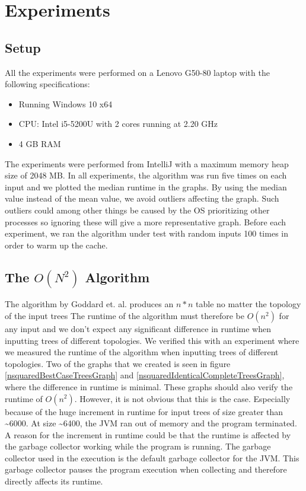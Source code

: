\chapter{Experiments}
\section{Setup}
All the experiments were performed on a Lenovo G50-80 laptop with the following specifications:

\begin{itemize}
	\item Running Windows 10 x64
	\item CPU: Intel i5-5200U with 2 cores running at 2.20 GHz
	\item 4 GB RAM
\end{itemize}

The experiments were performed from IntelliJ with a maximum memory heap size of 2048 MB.
In all experiments, the algorithm was run five times on each input and we plotted the median runtime in the graphs. By using the median value instead of the mean value, we avoid outliers affecting the graph. Such outliers could among other things be caused by the OS prioritizing other processes so ignoring these will give a more representative graph. Before each experiment, we ran the algorithm under test with random inputs 100 times in order to warm up the cache.

\section{The $O(N^2)$ Algorithm}
The algorithm by Goddard et. al. \cite{nsquared} produces an $n*n$ table no matter the topology of the input trees The runtime of the algorithm must therefore be $O(n^2)$ for any input and we don't expect any significant difference in runtime when inputting trees of different topologies. We verified this with an experiment where we measured the runtime of the algorithm when inputting trees of different topologies. Two of the graphs that we created is seen in figure \ref{nsquaredBestCaseTreesGraph} and \ref{nsquaredIdenticalCompleteTreesGraph}, where the difference in runtime is minimal. These graphs should also verify the runtime of $O(n^2)$. However, it is not obvious that this is the case. Especially because of the huge increment in runtime for input trees of size greater than \textasciitilde 6000. At size \textasciitilde 6400, the JVM ran out of memory and the program terminated. A reason for the increment in runtime could be that the runtime is affected by the garbage collector working while the program is running. The garbage collector used in the execution is the default garbage collector for the JVM. This garbage collector pauses the program execution when collecting and therefore directly affects its runtime.

